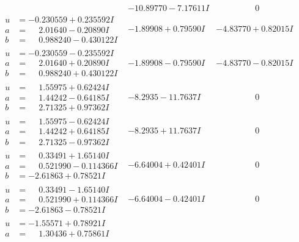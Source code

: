 \documentclass[1p]{elsarticle_modified}
\theoremstyle{definition}
\begin{document}
$$\begin{array}{c|c|c}
 & -10.89770 - 7.17611 I & \phantom{-0.000000 } 0 \\ \hline\begin{aligned}
u &= -0.230559 + 0.235592 I \\
a &= \phantom{-}2.01640 - 0.20890 I \\
b &= \phantom{-}0.988240 - 0.430122 I\end{aligned}
 & -1.89908 + 0.79590 I & -4.83770 + 0.82015 I \\ \hline\begin{aligned}
u &= -0.230559 - 0.235592 I \\
a &= \phantom{-}2.01640 + 0.20890 I \\
b &= \phantom{-}0.988240 + 0.430122 I\end{aligned}
 & -1.89908 - 0.79590 I & -4.83770 - 0.82015 I \\ \hline\begin{aligned}
u &= \phantom{-}1.55975 + 0.62424 I \\
a &= \phantom{-}1.44242 - 0.64185 I \\
b &= \phantom{-}2.71325 + 0.97362 I\end{aligned}
 & -8.2935 - 11.7637 I & \phantom{-0.000000 } 0 \\ \hline\begin{aligned}
u &= \phantom{-}1.55975 - 0.62424 I \\
a &= \phantom{-}1.44242 + 0.64185 I \\
b &= \phantom{-}2.71325 - 0.97362 I\end{aligned}
 & -8.2935 + 11.7637 I & \phantom{-0.000000 } 0 \\ \hline\begin{aligned}
u &= \phantom{-}0.33491 + 1.65140 I \\
a &= \phantom{-}0.521990 - 0.114366 I \\
b &= -2.61863 + 0.78521 I\end{aligned}
 & -6.64004 + 0.42401 I & \phantom{-0.000000 } 0 \\ \hline\begin{aligned}
u &= \phantom{-}0.33491 - 1.65140 I \\
a &= \phantom{-}0.521990 + 0.114366 I \\
b &= -2.61863 - 0.78521 I\end{aligned}
 & -6.64004 - 0.42401 I & \phantom{-0.000000 } 0 \\ \hline\begin{aligned}
u &= -1.55571 + 0.78921 I \\
a &= \phantom{-}1.30436 + 0.75861 I \\

\end{aligned}
\end{array}$$
\end{document}
